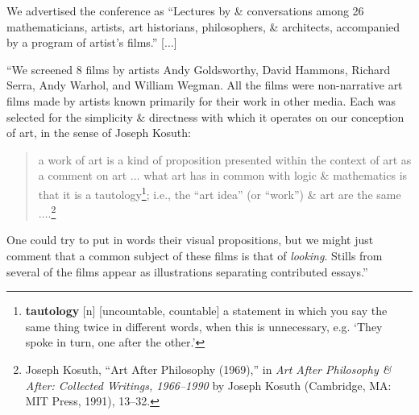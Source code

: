 \documentclass[oneside]{book}
\numberwithin{equation}{section}
\begin{document}
We advertised the conference as ``Lectures by \& conversations among 26 mathematicians, artists, art historians, philosophers, \& architects, accompanied by a program of artist's films.'' [$\ldots$]

``We screened 8 films by artists Andy Goldsworthy, David Hammons, Richard Serra, Andy Warhol, and William Wegman. All the films were non-narrative art films made by artists known primarily for their work in other media. Each was selected for the simplicity \& directness with which it operates on our conception of art, in the sense of Joseph Kosuth:
\begin{quotation}
	a work of art is a kind of proposition presented within the context of art as a comment on art $\ldots$ what art has in common with logic \& mathematics is that it is a tautology\footnote{\textbf{tautology} [n] [uncountable, countable] a statement in which you say the same thing twice in different words, when this is unnecessary, e.g. `They spoke in turn, one after the other.'}; i.e., the ``art idea'' (or ``work'') \& art are the same $\ldots$.\footnote{Joseph Kosuth, ``Art After Philosophy (1969),'' in \textit{Art After Philosophy \& After: Collected Writings, 1966--1990} by Joseph Kosuth (Cambridge, MA: MIT Press, 1991), 13--32.}
\end{quotation}
One could try to put in words their visual propositions, but we might just comment that a common subject of these films is that of \textit{looking}. Stills from several of the films appear as illustrations separating contributed essays.''
\end{document}
